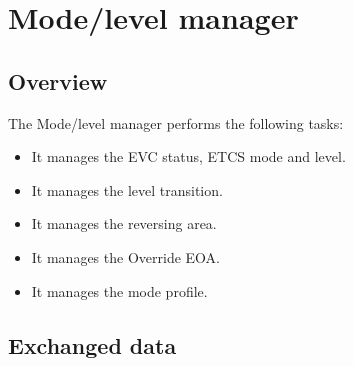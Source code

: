 \documentclass[nocc]{template/openetcs_report}
\begin{document}
\chapter{Mode/level manager}
\section{Overview}
The Mode/level manager performs the following tasks:
\begin{itemize}
\item	It manages the EVC status, ETCS mode and level.
\item	It manages the level transition.
\item	It manages the reversing area.
\item	It manages the Override EOA.
\item	It manages the mode profile.
\end{itemize}
\section{Exchanged data}
\end{document}

